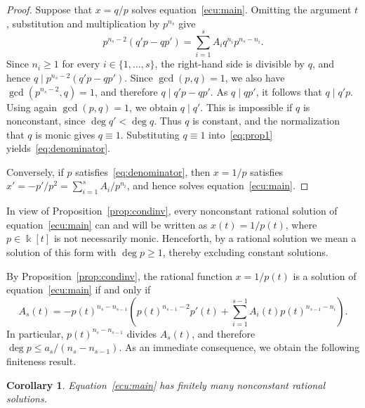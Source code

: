 \documentclass[12pt,a4paper]{amsart}
\numberwithin{theorem}{section}
\newtheorem{corollary}[theorem]{Corollary}
\theoremstyle{definition}
\begin{document}
	\begin{proof}
		Suppose that $x=q/p$ solves equation~\eqref{ecu:main}. Omitting the argument $t$, substitution and multiplication by $p^{n_s}$ give
		\begin{equation}\label{eq:prop1}
			p^{n_s-2}(q'p-qp')=\sum_{i=1}^s A_iq^{n_i}p^{n_s-n_i}.
		\end{equation}
		Since $n_i\geq1$ for every $i\in\{1,\ldots,s\}$, the right-hand side is divisible by $q$, and hence $q\mid p^{n_s-2}(q'p-qp')$. Since $\gcd(p,q)=1$, we also have $\gcd(p^{n_s-2},q)=1$, and therefore $q\mid q'p-qp'$. As $q\mid qp'$, it follows that $q\mid q'p$. Using again $\gcd(p,q)=1$, we obtain $q\mid q'$. This is impossible if $q$ is nonconstant, since $\deg q'<\deg q$. Thus $q$ is constant, and the normalization that $q$ is monic gives $q\equiv1$. Substituting $q\equiv1$ into~\eqref{eq:prop1} yields~\eqref{eq:denominator}.
		
		Conversely, if $p$ satisfies~\eqref{eq:denominator}, then $x=1/p$ satisfies $x'=-p'/p^2=\sum_{i=1}^s A_i/p^{n_i}$, and hence solves equation~\eqref{ecu:main}.
	\end{proof}
	
	In view of Proposition~\ref{prop:condinv}, every nonconstant rational solution of equation~\eqref{ecu:main} can and will be written as $x(t)=1/p(t)$, where $p\in\Bbbk[t]$ is not necessarily monic. Henceforth, by a rational solution we mean a solution of this form with $\deg p\geq1$, thereby excluding constant solutions.
	
	By Proposition~\ref{prop:condinv}, the rational function $x=1/p(t)$ is a solution of equation~\eqref{ecu:main} if and only if
	\begin{equation}\label{ecu:condinv}
		A_s(t)=-p(t)^{n_s-n_{s-1}}\left(p(t)^{n_{s-1}-2}p'(t)+\sum_{i=1}^{s-1}A_i(t)p(t)^{n_{s-1}-n_i}\right).
	\end{equation}
	In particular, $p(t)^{n_s-n_{s-1}}$ divides $A_s(t)$, and therefore $\deg p\leq a_s/(n_s-n_{s-1})$. As an immediate consequence, we obtain the following finiteness result.
	
	\begin{corollary}\label{cor:finiteness}
		Equation~\eqref{ecu:main} has finitely many nonconstant rational solutions.
	\end{corollary}
	
\end{document}
